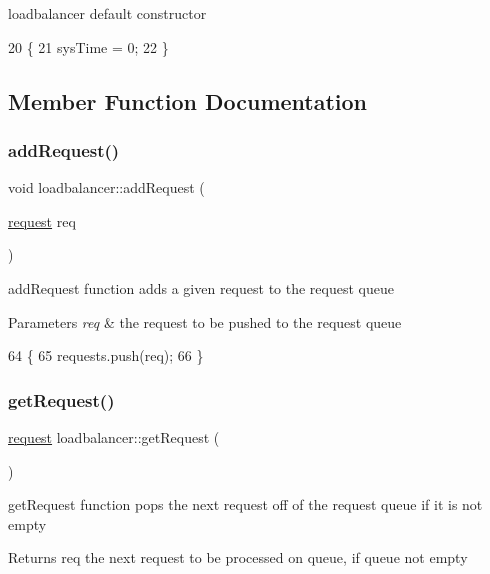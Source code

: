 loadbalancer default constructor 
\begin{DoxyCode}
20                            \{
21     sysTime = 0;
22 \}
\end{DoxyCode}


\subsection{Member Function Documentation}
\mbox{\label{classloadbalancer_a2c45d009dffc50f5d5d3a6c2b295311d}} 
\subsubsection{\texorpdfstring{add\+Request()}{addRequest()}}
{\footnotesize\ttfamily void loadbalancer\+::add\+Request (\begin{DoxyParamCaption}\item[{\hyperlink{structrequest}{request}}]{req }\end{DoxyParamCaption})}

add\+Request function adds a given request to the request queue 
\begin{DoxyParams}{Parameters}
{\em req} & the request to be pushed to the request queue \\
\hline
\end{DoxyParams}

\begin{DoxyCode}
64                                          \{
65     requests.push(req);
66 \}
\end{DoxyCode}
\mbox{\label{classloadbalancer_a3d1715e4b2218a7aa9ad74e3e4fa6167}} 
\subsubsection{\texorpdfstring{get\+Request()}{getRequest()}}
{\footnotesize\ttfamily \hyperlink{structrequest}{request} loadbalancer\+::get\+Request (\begin{DoxyParamCaption}{ }\end{DoxyParamCaption})}

get\+Request function pops the next request off of the request queue if it is not empty \begin{DoxyReturn}{Returns}
req the next request to be processed on queue, if queue not empty 
\end{DoxyReturn}

